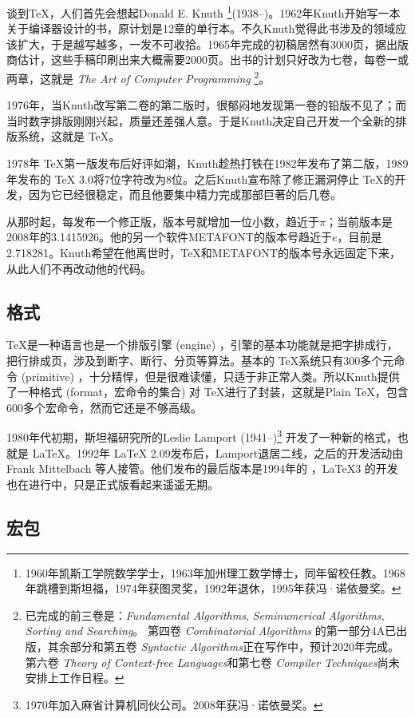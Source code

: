 谈到\TeX{}，人们首先会想起Donald E. Knuth \footnote{1960年凯斯工学院数学学士，1963年加州理工数学博士，同年留校任教。1968年跳槽到斯坦福，1974年获图灵奖，1992年退休，1995年获冯·诺依曼奖。}(1938--)。1962年Knuth开始写一本关于编译器设计的书，原计划是12章的单行本。不久Knuth觉得此书涉及的领域应该扩大，于是越写越多，一发不可收拾。1965年完成的初稿居然有3000页，据出版商估计，这些手稿印刷出来大概需要2000页。出书的计划只好改为七卷，每卷一或两章，这就是 \emph{The Art of Computer Programming} \footnote{已完成的前三卷是：\emph{Fundamental Algorithms}, \emph{Seminumerical Algorithms}, \emph{Sorting and Searching}。 第四卷 \emph{Combinatorial Algorithms} 的第一部分4A已出版，其余部分和第五卷 \emph{Syntactic Algorithms}正在写作中，预计2020年完成。第六卷 \emph{Theory of Context-free Languages}和第七卷 \emph{Compiler Techniques}尚未安排上工作日程。}。

1976年，当Knuth改写第二卷的第二版时，很郁闷地发现第一卷的铅版不见了；而当时数字排版刚刚兴起，质量还差强人意。于是Knuth决定自己开发一个全新的排版系统，这就是 \TeX。

1978年 \TeX 第一版发布后好评如潮，Knuth趁热打铁在1982年发布了第二版，1989年发布的 \TeX{} 3.0将7位字符改为8位。之后Knuth宣布除了修正漏洞停止 \TeX 的开发，因为它已经很稳定，而且他要集中精力完成那部巨著的后几卷。

从那时起，每发布一个修正版，版本号就增加一位小数，趋近于$\pi$；当前版本是2008年的3.1415926。他的另一个软件METAFONT的版本号趋近于$e$，目前是2.718281。Knuth希望在他离世时，\TeX 和METAFONT的版本号永远固定下来，从此人们不再改动他的代码。

\subsection{格式}

\TeX 是一种语言也是一个排版引擎 (engine) ，引擎的基本功能就是把字排成行，把行排成页，涉及到断字、断行、分页等算法。基本的 \TeX 系统只有300多个元命令 (primitive) ，十分精悍，但是很难读懂，只适于非正常人类。所以Knuth提供了一种格式 (format，宏命令的集合) 对 \TeX 进行了封装，这就是Plain \TeX ，包含600多个宏命令，然而它还是不够高级。

1980年代初期，斯坦福研究所的Leslie Lamport (1941--)\footnote{1970年加入麻省计算机同伙公司。2008年获冯·诺依曼奖。} 开发了一种新的格式，也就是 \LaTeX。1992年 \LaTeX{} 2.09发布后，Lamport退居二线，之后的开发活动由Frank Mittelbach 等人接管。他们发布的最后版本是1994年的 \LaTeXe，\LaTeX 3 的开发也在进行中，只是正式版看起来遥遥无期。

\subsection{宏包}

